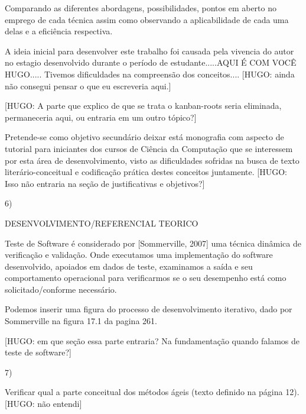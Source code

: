   Comparando as diferentes abordagens, possibilidades, pontos em aberto no emprego de cada técnica assim como observando a aplicabilidade de cada uma delas e a eficiência respectiva.

  A ideia inicial para desenvolver este trabalho foi causada pela vivencia do autor no estagio desenvolvido durante o período de estudante.....AQUI É COM VOCÊ HUGO..... Tivemos dificuldades na compreensão dos conceitos.... [HUGO: ainda não consegui pensar o que eu escreveria aqui.]

  [HUGO: A parte que explico de que se trata o kanban-roots seria eliminada, permaneceria aqui, ou entraria em um outro tópico?]

  Pretende-se como objetivo secundário deixar está monografia com aspecto de tutorial para iniciantes dos cursos de Ciência da Computação que se interessem por esta área de desenvolvimento, visto as dificuldades sofridas na busca de texto literário-conceitual e codificação prática destes conceitos juntamente. [HUGO: Isso não entraria na seção de justificativas e objetivos?]


6)

  DESENVOLVIMENTO/REFERENCIAL TEORICO

  Teste de Software é considerado por [Sommerville, 2007] uma técnica dinâmica de verificação e validação. Onde executamos uma implementação do software desenvolvido, apoiados em dados de teste, examinamos a saída e seu comportamento operacional para verificarmos se o seu desempenho está como solicitado/conforme necessário.

  Podemos inserir uma figura do processo de desenvolvimento iterativo, dado por Sommerville na figura 17.1 da pagina 261.

  [HUGO: em que seção essa parte entraria? Na fundamentação quando falamos de teste de software?]


7)

  Verificar qual a parte conceitual dos métodos ágeis (texto definido na página 12). [HUGO: não entendi]